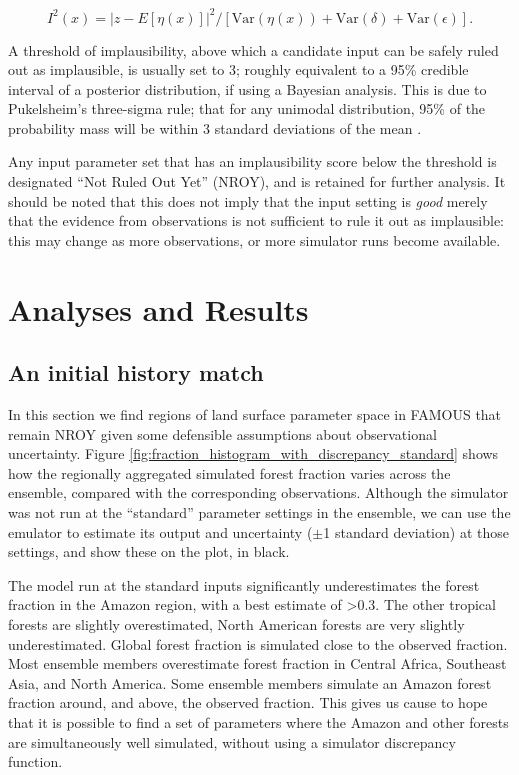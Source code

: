 \documentclass[esd, article]{copernicus} %
\begin{document}
\begin{equation}\label{eq:implausibility}
I^{2}(x)=  |z -E[\eta(x)]|^{2} / [\textrm{Var}(\eta(x)) +\textrm{Var}(\delta) +\textrm{Var}(\epsilon)].
\end{equation}

A threshold of implausibility, above which a candidate input can be safely ruled out as implausible, is usually set to 3; roughly equivalent to a 95\% credible interval of a posterior distribution, if using a Bayesian analysis. This is due to Pukelsheim's three-sigma rule; that for any unimodal distribution, 95\% of the probability mass will be within 3 standard deviations of the mean \citep{pukelsheim1994three}.

Any input parameter set that has an implausibility score below the threshold is designated ``Not Ruled Out Yet'' (NROY), and is retained for further analysis. It should be noted that this does not imply that the input setting is \emph{good} merely that the evidence from observations is not sufficient to rule it out as implausible: this may change as more observations, or more simulator runs become available.

\section{Analyses and Results}\label{AnalysesandResults}

\subsection{An initial history match}\label{ssec:initialhistorymatch}
In this section we find regions of land surface parameter space in FAMOUS that remain NROY given some defensible assumptions about observational uncertainty.  Figure \ref{fig:fraction_histogram_with_discrepancy_standard} shows how the regionally aggregated simulated forest fraction varies across the ensemble, compared with the corresponding observations. Although the simulator was not run at the ``standard'' parameter settings in the ensemble, we can use the emulator to estimate its output and uncertainty ($\pm$1 standard deviation) at those settings, and show these on the plot, in black.

The model run at the standard inputs significantly underestimates the forest fraction in the Amazon region, with a best estimate of >0.3. The other tropical forests are slightly overestimated, North American forests are very slightly underestimated. Global forest fraction is simulated close to the observed fraction. Most ensemble members overestimate forest fraction in Central Africa, Southeast Asia, and North America. Some ensemble members simulate an Amazon forest fraction around, and above, the observed fraction. This gives us cause to hope that it is possible to find a set of parameters where the Amazon and other forests are simultaneously well simulated, without using a simulator discrepancy function. 
\end{document}
